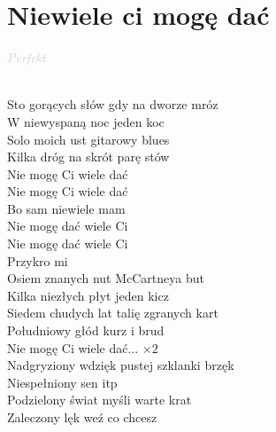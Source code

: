 \documentclass[a5paper, 10pt]{book}
\begin{document}
\section{Niewiele ci mogę dać}\textcolor{lightgray}{\textit{Perfekt}}\\~\\
\begin{minipage}[t]{0.7\textwidth}
Sto gorących słów gdy na dworze mróz\\
W niewyspaną noc jeden koc\\
Solo moich ust gitarowy blues\\
Kilka dróg na skrót parę stów\\

\hspace*{5mm}Nie mogę Ci wiele dać\\
\hspace*{5mm}Nie mogę Ci wiele dać\\
\hspace*{5mm}Bo sam niewiele mam\\
\hspace*{5mm}Nie mogę dać wiele Ci\\
\hspace*{5mm}Nie mogę dać wiele Ci\\
\hspace*{5mm}Przykro mi\\

Osiem znanych nut McCartneya but\\
Kilka niezłych płyt jeden kicz\\
Siedem chudych lat talię zgranych kart\\
Południowy głód kurz i brud\\

\hspace*{5mm}Nie mogę Ci wiele dać... $\times 2$\\

Nadgryziony wdzięk pustej szklanki brzęk\\
Niespełniony sen itp\\
Podzielony świat myśli warte krat\\
Zaleczony lęk weź co chcesz\\
\end{minipage}
\end{document}
